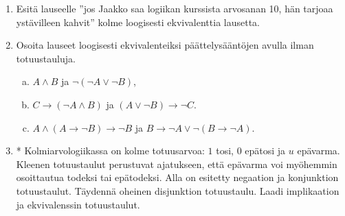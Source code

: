\begin{tehtavasivu}
\begin{enumerate}
\item Esitä lauseelle ''jos Jaakko saa logiikan kurssista
arvosanan 10, hän tarjoaa ystävilleen kahvit'' kolme
loogisesti ekvivalenttia lausetta.

\item Osoita lauseet loogisesti ekvivalenteiksi
päättelysääntöjen avulla ilman totuustauluja.
\begin{enumerate}[a)]
\item $A\land B$ ja $\lnot(\lnot A \lor \lnot B)$,
\item $C\to (\lnot A \land B)$ ja $(A\lor \lnot B)\to
\lnot C$.
\item $A \land (A\to \lnot B)\to \lnot B$ ja $B\to
\lnot A\lor \lnot (B\to \lnot A)$.
\end{enumerate}

\item * Kolmiarvologiikassa on kolme totuusarvoa: $1$
tosi, $0$ epätosi ja $u$ epävarma. Kleenen totuustaulut
perustuvat ajatukseen, että epävarma voi myöhemmin
osoittautua todeksi tai epätodeksi. Alla on esitetty
negaation ja konjunktion totuustaulut. Täydennä
oheinen disjunktion totuustaulu. Laadi implikaation ja
ekvivalenssin totuustaulut.


\end{enumerate}
\end{tehtavasivu}

